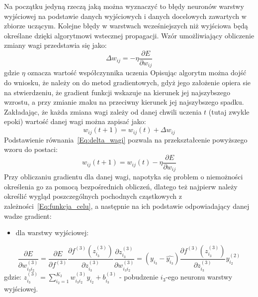 \documentclass[12pt,twoside]{article}
\begin{document}
Na początku jedyną rzeczą jaką można wyznaczyć to błędy neuronów warstwy wyjściowej na podstawie danych wyjściowych i danych docelowych zawartych w zbiorze uczącym. Kolejne błędy w warstwach wcześniejszych niż wyjściowa będą określane dzięki algorytmowi wstecznej propagacji.
Wzór umożliwiający obliczenie zmiany wagi przedstawia się jako:
\begin{equation}
	\Delta w_{ij} = - \eta\frac{\partial E}{\partial w_{ij}}
	\label{Eq:delta_wagi}
\end{equation}
gdzie $\eta$ oznacza wartość współczynnika uczenia
Opisując algorytm można dojść do wniosku, że należy on do metod gradientowych, gdyż jego założenie opiera sie na stwierdzeniu, że gradient funkcji wskazuje na kierunek jej najszybszego wzrostu, a przy zmianie znaku na przeciwny kierunek jej najszybszego spadku.
Zakładając, że każda zmiana wagi zależy od danej chwili uczenia $t$ (tutaj zwykle epoki) wartość danej wagi można zapisać jako:
\begin{equation}
	w_{ij}(t+1) = w_{ij}(t)+\Delta w_{ij}
\end{equation}
Podstawienie równania~\ref{Eq:delta_wagi} pozwala na przekształcenie powyższego wzoru do postaci:
\begin{equation}
	w_{ij}(t+1) = w_{ij}(t) - \eta\frac{\partial E}{\partial w_{ij}}
\end{equation}
Przy obliczaniu gradientu dla danej wagi, napotyka się problem o niemożności określenia go za pomocą bezpośrednich obliczeń, dlatego też najpierw należy określić wygląd poszczególnych pochodnych cząstkowych z zależności~\ref{Eq:funkcja_celu}, a następnie na ich podstawie odpowiadający danej wadze gradient:
\begin{itemize}
	\item dla warstwy wyjściowej:
\end{itemize}
\begin{equation}
	\frac{\partial E}{\partial w_{i_3i_2}^{(3)}}= \frac{\partial E}{\partial f^{(3)}}\frac{\partial f^{(3)}(z_{i_3}^{(3)})}{\partial z_{i_3}^{(3)}}\frac{\partial z_{i_3}^{(3)}}{\partial w_{i_3i_2}^{(3)}} = (y_{i_3} - \hat{y_{i_3}}) \frac{\partial f^{(3)}(z_{i_3}^{(3)})}{\partial z_{i_3}^{(3)}}y_{i_2}^{(2)}
\end{equation}
gdzie: $z_{i_3}^{(3)} = \sum_{i_2=1}^{K_2} w_{i_3i_2}^{(3)}y_{i_2}+b_{i_3}^{(3)}$ - pobudzenie $i_3$-ego neuronu warstwy wyjściowej.
\end{document}
